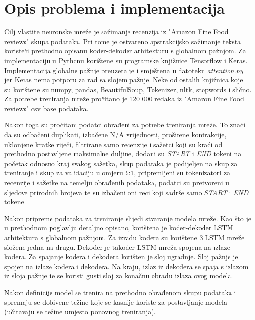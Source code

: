 \documentclass[times, utf8, zavrsni, numeric]{fer}
\begin{document}
\section{Opis problema i implementacija}
Cilj vlastite neuronske mreže je sažimanje recenzija iz "Amazon Fine Food reviews" skupa podataka.
Pri tome je ostvareno apstrakcijsko sažimanje teksta koristeći prethodno opisanu koder-dekoder arhitekturu s globalnom pažnjom.
Za implementaciju u Pythonu korištene su programske knjižnice Tensorflow i Keras.
Implementacija globalne pažnje preuzeta je i smještena u datoteku \emph{attention.py} jer Keras nema potporu za rad sa slojem pažnje.
Neke od ostalih knjižnica koje su korištene su numpy, pandas, BeautifulSoup, Tokenizer, nltk, stopwords i slično.
Za potrebe treniranja mreže pročitano je 120 000 redaka iz "Amazon Fine Food reviews" csv baze podataka.
\par
Nakon toga su pročitani podatci obrađeni za potrebe treniranja mreže.
To znači da su odbačeni duplikati, izbačene N/A vrijednosti, proširene kontrakcije, uklonjene kratke riječi, filtrirane samo recenzije i sažetci koji su kraći od prethodno postavljene maksimalne duljine, dodani su \emph{START} i \emph{END} tokeni na početak odnosno kraj svakog sažetka, skup podataka je podijeljen na skup za treniranje i skup za validaciju u omjeru 9:1, pripremljeni su tokenizatori za recenzije i sažetke na temelju obrađenih podataka, podatci su pretvoreni u sljedove prirodnih brojeva te su izbačeni oni reci koji sadrže samo \emph{START} i \emph{END} tokene.
\par
Nakon pripreme podataka za treniranje slijedi stvaranje modela mreže.
Kao što je u prethodnom poglavlju detaljno opisano, korištena je koder-dekoder LSTM arhitektura s globalnom pažnjom.
Za izradu kodera su korištene 3 LSTM mreže složene jedna na drugu.
Dekoder je također LSTM mreža spojena na izlaze kodera. Za spajanje kodera i dekodera korišten je sloj ugradnje.
Sloj pažnje je spojen na izlaze kodera i dekodera.
Na kraju, izlaz iz dekodera se spaja s izlazom iz sloja pažnje te se koristi gusti sloj za konačnu obradu izlaza ovog modela.
\par
Nakon definicije model se trenira na prethodno obrađenom skupu podataka i spremaju se dobivene težine koje se kasnije koriste za postavljanje modela (učitavaju se težine umjesto ponovnog treniranja).
\end{document}
